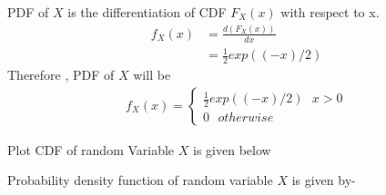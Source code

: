\documentclass[journal,12pt,twocolumn]{IEEEtran}
\begin{document}
PDF of $X$ is the differentiation of CDF $F_X(x)$ with respect to x. 
\begin{align}
    f_X(x) & = \frac{d (F_X (x) )}{dx} \\
           & = \frac{1}{2}  exp((-x)/2)
\end{align}
Therefore , PDF of $X$ will be 
\begin{align}
    f_X(x) =
    \begin{cases}
    \frac{1}{2}  exp((-x)/2) \ \ \ x > 0 \\
    0 \ \ \ otherwise
    \end{cases}
\end{align}

Plot CDF of random Variable $X$ is given below


\hskip 5pt
Probability density function of random variable $X$ is given by-

\\
\end{document}
